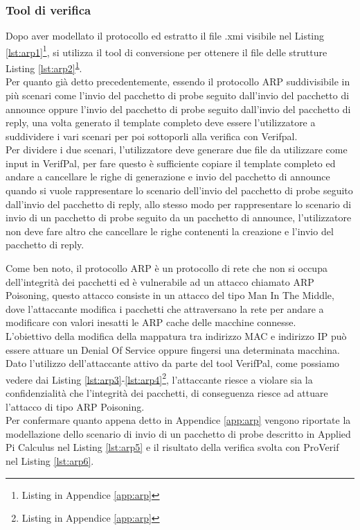 \subsubsection*{Tool di verifica}
Dopo aver modellato il protocollo ed estratto il file .xmi visibile nel Listing \ref{lst:arp1}\footnote{\label{note:b}Listing in Appendice \ref{app:arp}}, si utilizza il tool di conversione per ottenere il file delle strutture Listing \ref{lst:arp2}\textsuperscript{\ref{note:b}}.\\
Per quanto già detto precedentemente, essendo il protocollo ARP suddivisibile in più scenari come l'invio del pacchetto di probe seguito dall'invio del pacchetto di announce oppure l'invio del pacchetto di probe seguito dall'invio del pacchetto di reply, una volta generato il template completo deve essere l'utilizzatore a suddividere i vari scenari per poi sottoporli alla verifica con Verifpal.\\
Per dividere i due scenari, l'utilizzatore deve generare due file da utilizzare come input in VerifPal, per fare questo è sufficiente copiare il template completo ed andare a cancellare le righe di generazione e invio del pacchetto di announce quando si vuole rappresentare lo scenario dell'invio del pacchetto di probe seguito dall'invio del pacchetto di reply, allo stesso modo per rappresentare lo scenario di invio di un pacchetto di probe seguito da un pacchetto di announce, l'utilizzatore non deve fare altro che cancellare le righe contenenti la creazione e l'invio del pacchetto di reply.
\newpage

\newpage


\noindent Come ben noto, il protocollo ARP è un protocollo di rete che non si occupa dell'integrità dei pacchetti ed è vulnerabile ad un attacco chiamato ARP Poisoning, questo attacco consiste in un attacco del tipo Man In The Middle, dove l'attaccante modifica i pacchetti che attraversano la rete per andare a modificare con valori inesatti le ARP cache delle macchine connesse.\\
L'obiettivo della modifica della mappatura tra indirizzo MAC e indirizzo IP può essere attuare un Denial Of Service oppure fingersi una determinata macchina.\\
Dato l'utilizzo dell'attaccante attivo da parte del tool VerifPal, come possiamo vedere dai Listing \ref{lst:arp3}-\ref{lst:arp4}\footnote{Listing in Appendice \ref{app:arp}}, l'attaccante riesce a violare sia la confidenzialità che l'integrità dei pacchetti, di conseguenza riesce ad attuare l'attacco di tipo ARP Poisoning.\\
Per confermare quanto appena detto in Appendice \ref{app:arp} vengono riportate la modellazione dello scenario di invio di un pacchetto di probe descritto in Applied Pi Calculus nel Listing \ref{lst:arp5} e il risultato della verifica svolta con ProVerif nel Listing \ref{lst:arp6}.\\ 
